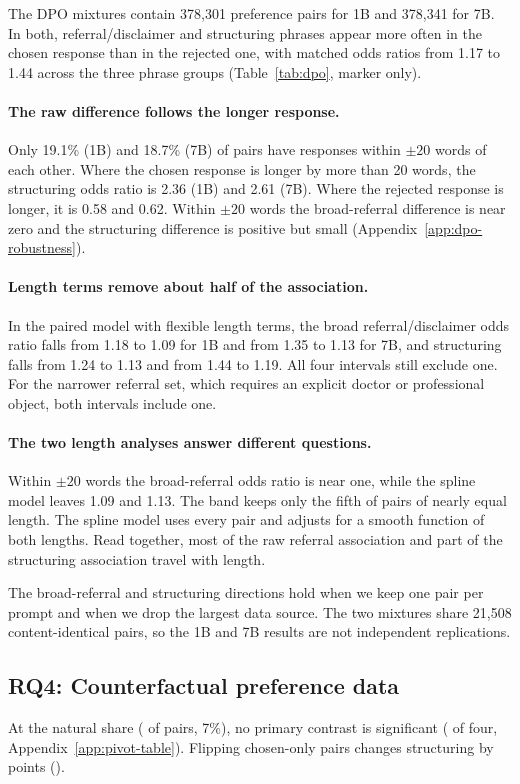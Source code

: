 \documentclass[11pt]{article}
\newif\ifpivot
\begin{document}
The DPO mixtures contain 378{,}301 preference pairs for 1B and 378{,}341 for
7B. In both, referral/disclaimer and structuring phrases appear more often in
the chosen response than in the rejected one, with matched odds ratios from
1.17 to 1.44 across the three phrase groups (Table~\ref{tab:dpo}, marker only).

\paragraph{The raw difference follows the longer response.}
Only 19.1\% (1B) and 18.7\% (7B) of pairs have responses within $\pm20$ words
of each other. Where the chosen response is longer by more than 20 words,
the structuring odds ratio is 2.36 (1B) and 2.61 (7B). Where the rejected
response is longer, it is 0.58 and 0.62. Within $\pm20$ words the
broad-referral difference is near zero and the structuring difference is
positive but small (Appendix~\ref{app:dpo-robustness}).

\paragraph{Length terms remove about half of the association.}
In the paired model with flexible length terms, the broad referral/disclaimer
odds ratio falls from 1.18 to 1.09 for 1B and from 1.35 to 1.13 for 7B, and
structuring falls from 1.24 to 1.13 and from 1.44 to 1.19. All four intervals
still exclude one. For the narrower referral set, which requires an explicit
doctor or professional object, both intervals include one.

\paragraph{The two length analyses answer different questions.}
Within $\pm20$ words the broad-referral odds ratio is near one, while the
spline model leaves 1.09 and 1.13. The band keeps only the fifth of pairs
of nearly equal length. The spline model uses every pair and adjusts for a
smooth function of both lengths. Read together, most of the raw referral
association and part of the structuring association travel with length.

The broad-referral and structuring directions hold when we keep one pair per
prompt and when we drop the largest data source. The two mixtures share 21{,}508
content-identical pairs, so the 1B and 7B results are not independent
replications.

\ifpivot
\subsection{RQ4: Counterfactual preference data}
\label{sec:pivot}
At the natural share (\pivNChosenOnly{} of \pivNPairs{} pairs, 7\%), no
primary contrast is significant (\pivNSig{} of four, Appendix~\ref{app:pivot-table}).
Flipping chosen-only pairs changes structuring by \pivFlipStruct{} points
(\pivFlipStructCI{}).
\end{document}
